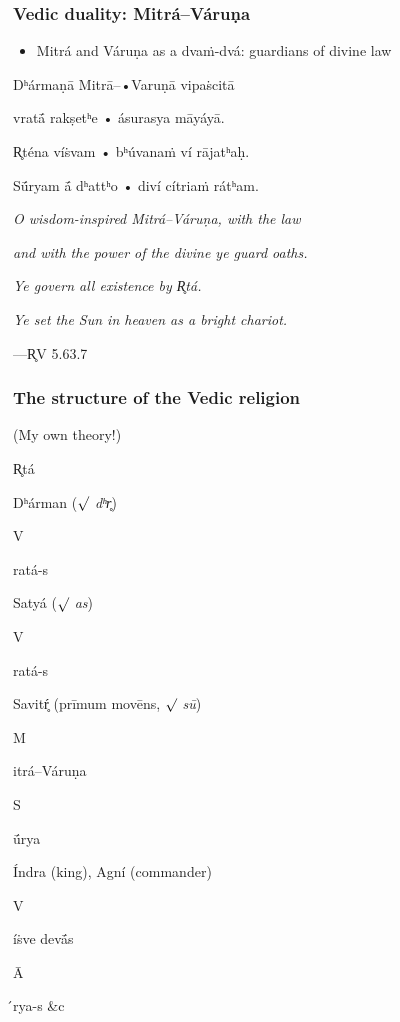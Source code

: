 \documentclass[pdf]{beamer}
\newcommand{\Subitem}[1]{{\setlength\itemindent{12pt} \item[-] #1}}
\newcommand{\Subsubitem}[1]{{\setlength\itemindent{24pt} \item[○] #1}}
\begin{document}
\begin{frame} \frametitle{Vedic duality: Mitrá--Váruṇa}
\begin{itemize}
	\item Mitrá and Váruṇa as a dvaṁ-dvá: guardians of divine law
\end{itemize}
\begin{center}
	Dʰármaṇā Mitrā--•Varuṇā vipaṡcitā

	vratā́ rakṣetʰe • ásurasya māyáyā.

	R̥téna víṡvam • bʰúvanaṁ ví rājatʰaḥ.

	Sū́ryam ā́ dʰattʰo • diví cítriaṁ rátʰam.

	\vspace{12pt}

	\textit{O wisdom-inspired Mitrá--Váruṇa, with the law}

	\textit{and with the power of the divine ye guard oaths.}

	\textit{Ye govern all existence by R̥tá.}

	\textit{Ye set the Sun in heaven as a bright chariot.}

	\vspace{12pt}

 	---R̥V 5.63.7
\end{center}
\end{frame}

\begin{frame} \frametitle{The structure of the Vedic religion}
(My own theory!)
\begin{itemize}
	\item R̥tá 
	\Subitem {Dʰárman ($\surd$ \textit{dʰr̥})}
	\Subsubitem Vratá-s
	\Subitem {Satyá ($\surd$ \textit{as})}
	\Subsubitem Vratá-s
\end{itemize}
\begin{itemize}
	\item {Savitŕ̥ (prīmum movēns, $\surd$ \textit{sū})}
	\Subitem Mitrá--Váruṇa
	\Subsubitem Sū́rya
	\item Índra (king), Agní (commander)
	\Subitem Víṡve devā́s
	\Subsubitem Ā́rya-s \&c
\end{itemize}
\end{frame}
\end{document}
